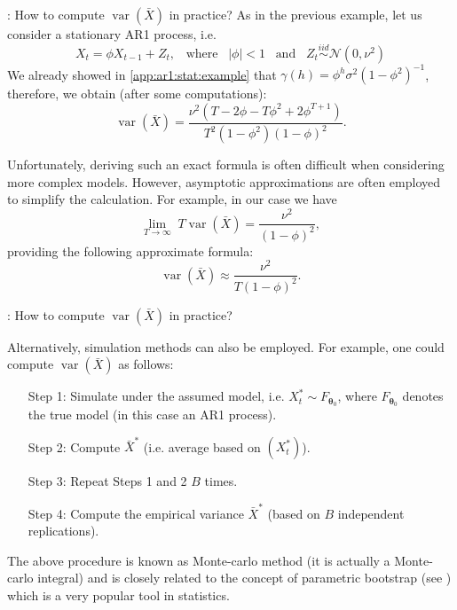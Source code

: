 \documentclass[envcountsect,usenames,dvipsnames]{beamer}
\DeclareMathOperator*{\var}{var}
\theoremstyle{mystyle}
\begin{document}
\begin{frame}{\thesubsection: How to compute $\var \left(\bar{X}\right)$ in practice?}
	\small
		As in the previous example, let us consider a stationary AR1 process, i.e.
		\begin{equation*}
			X_t = \phi X_{t-1} + Z_t, \;\;\; \text{where} \;\;\; |\phi| < 1 \;\;\; \text{and} \;\;\;  Z_t  \stackrel{iid}{\sim} \mathcal{N} \left(0, \nu^2\right)
		\end{equation*}
		 We already showed in \ref{app:ar1:stat:example} that $\gamma(h) = \phi^h \sigma^2 \left(1 - \phi^2\right)^{-1}$, therefore, we obtain (after some computations):
		\begin{equation}
			\var \left( {\bar X} \right) = \frac{\nu^2 \left( T - 2\phi - T \phi^2 + 2 \phi^{T + 1}\right)}{T^2\left(1-\phi^2\right)\left(1-\phi\right)^2}.
		\end{equation}

		Unfortunately, deriving such an exact formula is often difficult when considering more complex models. However, asymptotic approximations are often employed to simplify the calculation. For example, in our case we have
		\begin{equation*}
			\lim_{T \to \infty } \; T \var \left( {\bar X} \right) = \frac{\nu^2}{\left(1-\phi\right)^2},
		\end{equation*}
		providing the following approximate formula:
		\begin{equation*}
		\var \left( {\bar X} \right) \approx \frac{\nu^2}{T \left(1-\phi\right)^2}	.
		\end{equation*}
\end{frame}


\begin{frame}{\thesubsection: How to compute $\var \left(\bar{X}\right)$ in practice?}
	
		Alternatively, simulation methods can also be employed. For example, one could compute $\var \left( {\bar X} \right)$ as follows:
		\begin{enumerate}
		\setlength{\itemindent}{0.4in}
			\item[Step 1:] Simulate under the assumed model, i.e. $X_t^* \sim F_{\bm\theta_0}$, where $F_{\bm\theta_0}$ denotes the true model (in this case an AR1 process).
			\item[Step 2:] Compute ${\bar X^*}$ (i.e. average based on $(X_t^*)$).
			\item[Step 3:] Repeat Steps 1 and 2 $B$ times.
			\item[Step 4:] Compute the empirical variance ${\bar X^*}$ (based on $B$ independent replications).
		\end{enumerate}
		
   The above procedure is known as Monte-carlo method (it is actually a Monte-carlo integral) and is closely related to the concept of parametric bootstrap (see \cite{efron1994introduction}) which is a very popular tool in statistics. %
\end{frame}
\end{document}
